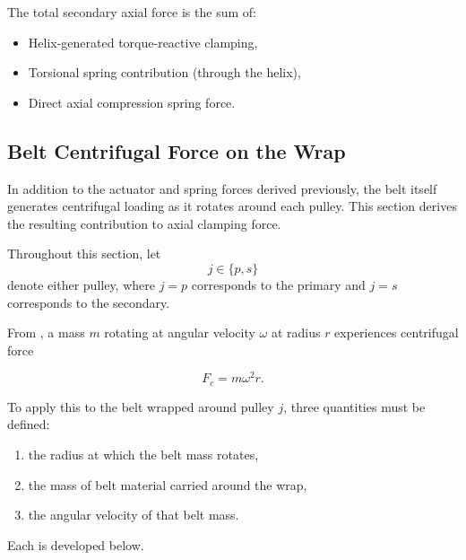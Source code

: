 \documentclass[11pt]{article}
\numberwithin{equation}{section}
\newcounter{theory}
\begin{document}
The total secondary axial force is the sum of:

\begin{itemize}
    \item Helix-generated torque-reactive clamping,
    \item Torsional spring contribution (through the helix),
    \item Direct axial compression spring force.
\end{itemize}


\subsection{Belt Centrifugal Force on the Wrap}
\label{sec:belt-centrifugal}

In addition to the actuator and spring forces derived previously, the belt
itself generates centrifugal loading as it rotates around each pulley.
This section derives the resulting contribution to axial clamping force.

Throughout this section, let
\[
j \in \{p,s\}
\]
denote either pulley, where \(j=p\) corresponds to the primary and
\(j=s\) corresponds to the secondary.

From , a mass \(m\) rotating at angular velocity
\(\omega\) at radius \(r\) experiences centrifugal force

\[
F_c = m\omega^2 r.
\]

To apply this to the belt wrapped around pulley \(j\), three quantities must be defined:

\begin{enumerate}
    \item the radius at which the belt mass rotates,
    \item the mass of belt material carried around the wrap,
    \item the angular velocity of that belt mass.
\end{enumerate}

Each is developed below.

\end{document}
